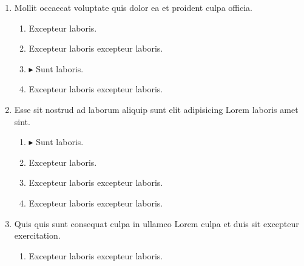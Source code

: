 \documentclass[a4paper,12pt]{article}
\begin{document}
\begin{enumerate}[label=\textbf{\arabic*.}]
\begin{multicols}{4}
\begin{enumerate}
		\item  15pt
    
		\item $\blacktriangleright$  12pt
    
		\item  13pt
    
	\end{enumerate}

\end{multicols}
\item Mollit occaecat voluptate quis dolor ea et proident culpa officia.
\begin{multicols}{2}
	\begin{enumerate}
		\item  Excepteur laboris.
    
		\item  Excepteur laboris excepteur laboris.
  
		\item $\blacktriangleright$  Sunt laboris.
    
		\item  Excepteur laboris excepteur laboris.
    
	\end{enumerate}

\end{multicols}
\item Esse sit nostrud ad laborum aliquip sunt elit adipisicing Lorem laboris amet sint.
\begin{multicols}{2}
	\begin{enumerate}
		\item $\blacktriangleright$  Sunt laboris.
    
		\item  Excepteur laboris.
    
		\item  Excepteur laboris excepteur laboris.
  
		\item  Excepteur laboris excepteur laboris.
    
	\end{enumerate}

\end{multicols}
\item Quis quis sunt consequat culpa in ullamco Lorem culpa et duis sit excepteur exercitation.
\begin{multicols}{2}
	\begin{enumerate}
		\item  Excepteur laboris excepteur laboris.
  

\end{enumerate}
\end{multicols}
\end{enumerate}
\end{document}
